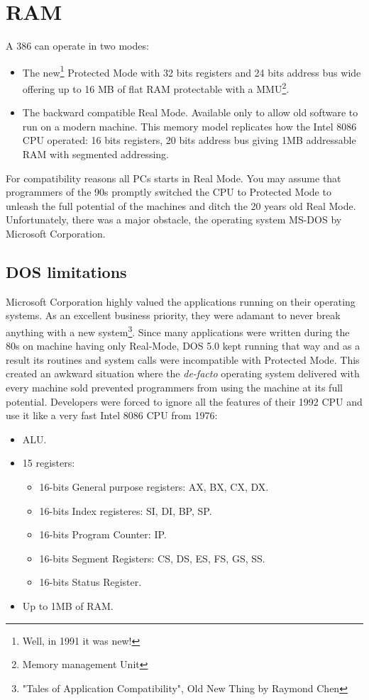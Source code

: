\documentclass[book.tex]{subfiles}
\begin{document}
\section{RAM}
A 386 can operate in two modes:\\
\par
\begin{itemize}
  \item The new\footnote{Well, in 1991 it was new!} Protected Mode with  32 bits registers and 24 bits address bus wide offering up to 16 MB of flat RAM protectable with a MMU\footnote{Memory management Unit}.
  \item The backward compatible Real Mode. Available only to allow old software to run on a modern machine. This memory model replicates how the Intel 8086 CPU operated: 16 bits registers, 20 bits address bus giving 1MB addressable RAM with segmented addressing. 
\end{itemize}
For compatibility reasons all PCs starts in Real Mode. You may assume that programmers of the 90s promptly switched the CPU to Protected Mode to unleash the full potential of the machines and ditch the 20 years old Real Mode. Unfortunately, there was a major obstacle, the operating system MS-DOS by Microsoft Corporation.
  






  \subsection{DOS limitations}
  Microsoft Corporation highly valued the applications running on their operating systems. As an excellent business priority, they were adamant to never break anything with a new system\footnote{"Tales of Application Compatibility", Old New Thing by Raymond Chen}.  Since many applications were written during the 80s on machine having only Real-Mode, DOS 5.0 kept running that way and as a result its routines and system calls were incompatible with Protected Mode. This created an awkward situation where the \emph{de-facto} operating system delivered with every machine sold prevented programmers from using the machine at its full potential. Developers were forced to ignore all the features of their 1992 CPU and use it like a very fast Intel 8086 CPU from 1976:\\
\begin{itemize}
\item ALU.
\item 15 registers:
\begin{itemize}
  \item 16-bits General purpose registers: AX, BX, CX, DX.
  \item 16-bits Index registeres: SI, DI, BP, SP.
  \item 16-bits Program Counter: IP.
  \item 16-bits Segment Registers: CS, DS, ES, FS, GS, SS.
  \item 16-bits Status Register.
\end{itemize}
\item Up to 1MB of RAM.
\end{itemize}
\end{document}
